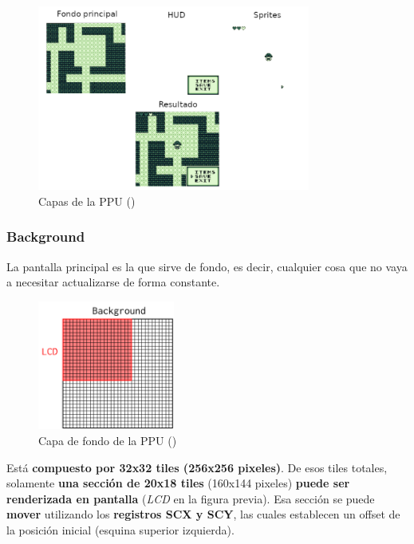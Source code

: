 \begin{figure}[H]
    \centering
    \includegraphics[width=0.8\textwidth]{include/images/layers.png}
    \caption{Capas de la PPU (\cite{goldensacra})}
    \label{figure:ppu_layers}
\end{figure}

\subsubsection{Background}

La pantalla principal es la que sirve de fondo, es decir, cualquier cosa que no vaya a necesitar actualizarse de forma constante.

\begin{figure}[H]
    \centering
    \includegraphics[width=0.4\textwidth]{include/images/grid_bg.png}
    \caption{Capa de fondo de la PPU (\cite{gbedg})}
    \label{figure:bg_layer}
\end{figure}

Está \textbf{compuesto por 32x32 tiles (256x256 pixeles)}. De esos tiles totales, solamente \textbf{una sección de 20x18 tiles} (160x144 pixeles) \textbf{puede ser renderizada en pantalla} (\textit{LCD} en la figura previa). Esa sección se puede \textbf{mover} utilizando los \textbf{registros SCX y SCY}, las cuales establecen un offset de la posición inicial (esquina superior izquierda).

